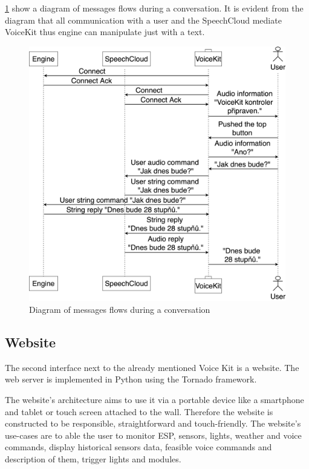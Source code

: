 \cref{fig:message_flow} show a diagram of messages flows during a conversation. It is evident from the diagram that all communication with a user and the SpeechCloud mediate VoiceKit thus engine can manipulate just with a text.

\begin{figure}[H]
	\centering
	\includegraphics[width=\textwidth]{img/message_flow.png}
	\caption{Diagram of messages flows during a conversation}
	\label{fig:message_flow}
\end{figure}

\subsection{Website}

The second interface next to the already mentioned Voice Kit is a website. The web server is implemented in Python using the Tornado framework.

The website's architecture aims to use it via a portable device like a smartphone and tablet or touch screen attached to the wall. Therefore the website is constructed to be responsible, straightforward and touch-friendly. The website's use-cases are to able the user to monitor ESP, sensors, lights, weather and voice commands, display historical sensors data, feasible voice commands and description of them, trigger lights and modules.

